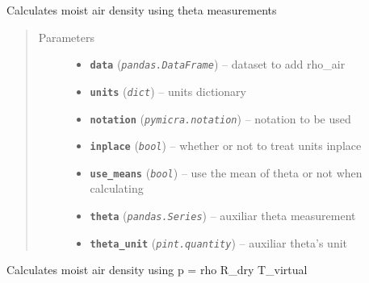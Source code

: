 \documentclass[a4paper,10pt,oneside]{sphinxmanual}
\begin{document}
\begin{fulllineitems}
\label{pymicra:pymicra.physics.airDensity_from_theta}
Calculates moist air density using theta measurements
\begin{quote}\begin{description}
\item[{Parameters}] \leavevmode\begin{itemize}
\item {} 
\textbf{\texttt{data}} (\emph{\texttt{pandas.DataFrame}}) -- dataset to add rho\_air

\item {} 
\textbf{\texttt{units}} (\emph{\texttt{dict}}) -- units dictionary

\item {} 
\textbf{\texttt{notation}} (\emph{\texttt{pymicra.notation}}) -- notation to be used

\item {} 
\textbf{\texttt{inplace}} (\emph{\texttt{bool}}) -- whether or not to treat units inplace

\item {} 
\textbf{\texttt{use\_means}} (\emph{\texttt{bool}}) -- use the mean of theta or not when calculating

\item {} 
\textbf{\texttt{theta}} (\emph{\texttt{pandas.Series}}) -- auxiliar theta measurement

\item {} 
\textbf{\texttt{theta\_unit}} (\emph{\texttt{pint.quantity}}) -- auxiliar theta's unit

\end{itemize}

\end{description}\end{quote}

\end{fulllineitems}


\begin{fulllineitems}
\label{pymicra:pymicra.physics.airDensity_from_theta_v}
Calculates moist air density using p = rho R\_dry T\_virtual

\end{fulllineitems}
\end{document}
